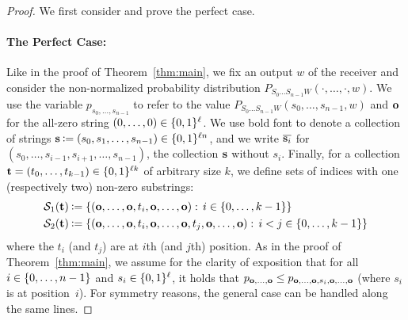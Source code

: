 \begin{proof}
We first consider and prove the perfect case. 

\paragraph{\sc The Perfect Case: }

Like in the proof of Theorem~\ref{thm:main}, we fix an output $w$ of the
receiver and consider the non-normalized probability distribution
$P_{S_0 \ldots S_{n-1}W}(\cdot,\ldots,\cdot,w)$. We use the variable
$p_{s_0,\ldots,s_{n-1}}$ to refer to the value $P_{S_0 \ldots S_{n-1}
  W}(s_0,\ldots,s_{n-1},w)$ and $\text{\boldmath${\bf o}$}$ for the all-zero string
$(0,\ldots,0) \in \{0,1\}^{\ell}$. We use bold font to
denote a collection of strings $\bs \assign
(s_0,s_1,\ldots,s_{n-1}) \in \set{0,1}^{\ell n}$, and we write 
$\overline{\text{\boldmath${\bf s}$}_i}$ for $(s_0,\ldots,s_{i-1},s_{i+1},\ldots,s_{n-1})$, 
the collection $\text{\boldmath${\bf s}$}$ without $s_i$. Finally, for a collection 
$\text{\boldmath${\bf t}$} = (t_0,\ldots,t_{k-1}) \in \{0,1\}^{\ell k}$ of arbitrary
size $k$, we define sets of indices with one (respectively two) non-zero
substrings:
\begin{align*}
  \Sone[\b{t}] &\assign
  \Set{(\zero,\ldots,\zero,t_i,\zero,\ldots,\zero)}{i \in
    \set{0,\ldots,k-1}}\\ 
  \Stwo[\b{t}] &\assign
  \Set{(\zero,\ldots,\zero,t_i,\zero,\ldots,\zero,t_j,\zero,\ldots,\zero)}{i
    < j \in \set{0,\ldots,k-1}}
\end{align*}
where the $t_i$ (and $t_j$) are at $i$th (and $j$th) position. 
%
As in the proof of Theorem~\ref{thm:main}, we assume for the clarity
of exposition that for all $i \in \{0,\ldots,n-1\}$ and $s_i \in
\{0,1\}^{\ell}$, it holds that $p_{\text{\boldmath${\bf o}$},\ldots,\text{\boldmath${\bf o}$}} \leq
p_{\text{\boldmath${\bf o}$},\ldots,\text{\boldmath${\bf o}$},s_i,\text{\boldmath${\bf o}$},\ldots,\text{\boldmath${\bf o}$}}$ (where $s_i$ is at
position~$i$). For symmetry reasons, the general case can be handled
along the same lines.


\end{proof}
